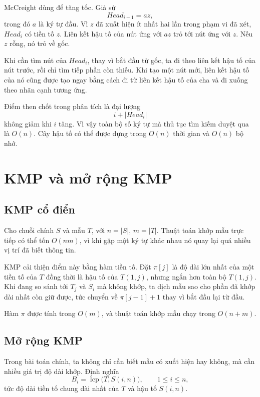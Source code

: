 \documentclass[11pt]{article}
\begin{document}
McCreight dùng  để tăng tốc. Giả sử
\[
  \mathit{Head}_{i-1}=az,
\]
trong đó \(a\) là ký tự đầu. Vì \(z\) đã xuất hiện ít nhất hai lần trong phạm
vi đã xét, \(\mathit{Head}_i\) có tiền tố \(z\). Liên kết hậu tố của nút ứng
với \(az\) trỏ tới nút ứng với \(z\). Nếu \(z\) rỗng, nó trỏ về gốc.

Khi cần tìm nút của \(\mathit{Head}_i\), thay vì bắt đầu từ gốc, ta đi theo
liên kết hậu tố của nút trước, rồi chỉ tìm tiếp phần còn thiếu. Khi tạo một
nút mới, liên kết hậu tố của nó cũng được tạo ngay bằng cách đi từ liên kết
hậu tố của cha và đi xuống theo nhãn cạnh tương ứng.

Điểm then chốt trong phân tích là đại lượng
\[
  i+|\mathit{Head}_i|
\]
không giảm khi \(i\) tăng. Vì vậy toàn bộ số ký tự mà thủ tục tìm kiếm duyệt
qua là \(O(n)\). Cây hậu tố có thể được dựng trong \(O(n)\) thời gian và
\(O(n)\) bộ nhớ.

\section{KMP và mở rộng KMP}

\subsection{KMP cổ điển}

Cho chuỗi chính \(S\) và mẫu \(T\), với \(n=|S|\), \(m=|T|\). Thuật toán khớp
mẫu trực tiếp có thể tốn \(O(nm)\), vì khi gặp một ký tự khác nhau nó quay lại
quá nhiều vị trí đã biết thông tin.

KMP cải thiện điểm này bằng hàm tiền tố. Đặt \(\pi[j]\) là độ dài lớn nhất
của một tiền tố của \(T\) đồng thời là hậu tố của \(T(1,j)\), nhưng ngắn hơn
toàn bộ \(T(1,j)\). Khi đang so sánh tới \(T_j\) và \(S_i\) mà không khớp,
ta dịch mẫu sao cho phần đã khớp dài nhất còn giữ được, tức chuyển về
\(\pi[j-1]+1\) thay vì bắt đầu lại từ đầu.

Hàm \(\pi\) được tính trong \(O(m)\), và thuật toán khớp mẫu chạy trong
\(O(n+m)\).

\subsection{Mở rộng KMP}

Trong bài toán chính, ta không chỉ cần biết mẫu có xuất hiện hay không, mà cần
nhiều giá trị độ dài khớp. Định nghĩa
\[
  B_i=\operatorname{lcp}\bigl(T,S(i,n)\bigr),\qquad 1\le i\le n,
\]
tức độ dài tiền tố chung dài nhất của \(T\) và hậu tố \(S(i,n)\).
\end{document}
